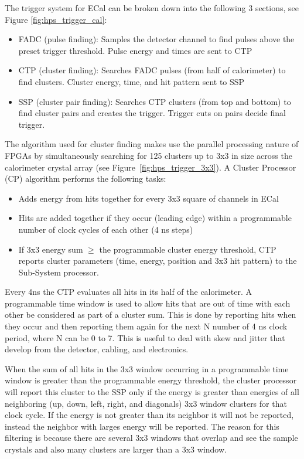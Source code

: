 The trigger system for ECal can be broken down into the following 3 sections, see Figure \ref{fig:hps_trigger_cal}:
 \begin{itemize}
 \item FADC (pulse finding): Samples the detector channel to find pulses above the preset trigger threshold. Pulse energy and times are sent to CTP
 \item CTP (cluster finding): Searches FADC pulses (from half of calorimeter) to find clusters. Cluster energy, time, and hit pattern sent to SSP
 \item SSP (cluster pair finding): Searches CTP clusters (from top and bottom) to find cluster pairs and creates the trigger. Trigger cuts on pairs decide final trigger.
 \end{itemize}
 
The algorithm used for cluster finding makes use the parallel processing nature of FPGAs by simultaneously searching for 125 clusters up to 3x3 in size across the calorimeter crystal array (see Figure~\ref{fig:hps_trigger_3x3}).  
A Cluster Processor (CP) algorithm performs the following tasks:

\begin{itemize}
\item Adds energy from hits together for every 3x3 square of channels in ECal
\item Hits are added together if they occur (leading edge) within a programmable number of clock cycles of each other (4 ns steps)
\item If 3x3 energy sum $\ge$  the programmable cluster energy threshold, CTP reports cluster parameters (time, energy, position and 3x3 hit pattern) to the Sub-System processor. 
\end{itemize}

Every 4ns the CTP evaluates all hits in its half of the calorimeter. A programmable time window is used to allow hits that are out of time with each other be considered as part of a cluster sum. This is done by reporting hits when they occur and then reporting them again for the next N number of 4 ns clock period, where N can be 0 to 7. This is useful to deal with skew and jitter that develop from the detector, cabling, and electronics.

When the sum of all hits in the 3x3 window occurring in a programmable time window is greater than the programmable energy threshold, the cluster processor will report this cluster to the SSP only if the energy is greater than energies of all neighboring (up, down, left, right, and diagonals) 3x3 window clusters for that clock cycle. If the energy is not greater than its neighbor it will not be reported, instead the neighbor with larges energy will be reported. The reason for this filtering is because there are several 3x3 windows that overlap and see the sample crystals and also many clusters are larger than a 3x3 window.

